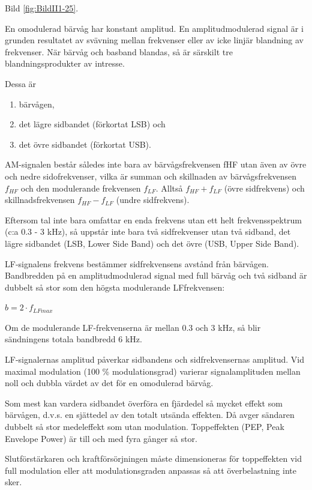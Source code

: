Bild \ref{fig:BildII1-25}.

En omodulerad bärvåg har konstant amplitud. En amplitudmodulerad signal är i
grunden resultatet av svävning mellan frekvenser eller av icke linjär blandning
av frekvenser. När  bärvåg och basband blandas, så är särskilt tre
blandningsprodukter av intresse.

Dessa är

\begin{enumerate}[label=-,noitemsep]
\item bärvågen,
\item det lägre sidbandet (förkortat LSB) och
\item det övre sidbandet (förkortat USB).
\end{enumerate}

AM-signalen består således inte bara av bärvågsfrekvensen fHF utan även av övre
och nedre sidofrekvenser, vilka är summan och skillnaden av bärvågsfrekvensen
\(f_{HF}\) och den modulerande frekvensen \(f_{LF}\). Alltså \(f_{HF} + f_{LF}\)
(övre sidfrekvens) och skillnadsfrekvensen \(f_{HF} - f_{LF}\) (undre
sidfrekvens).

Eftersom tal inte bara omfattar en enda frekvens utan ett helt frekvensspektrum
(c:a 0.3 - 3 kHz), så uppstår inte bara två sidfrekvenser utan två sidband, det
lägre sidbandet (LSB, Lower Side Band) och det övre (USB, Upper Side Band).

LF-signalens frekvens bestämmer sidfrekvensens avstånd från bärvågen.
Bandbredden på en amplitudmodulerad signal med full bärvåg och två sidband är
dubbelt så stor som den högsta modulerande LFfrekvensen:

\(b= 2 \cdot f_{LFmax}\)

Om de modulerande LF-frekvenserna är mellan 0.3 och 3 kHz, så blir sändningens
totala bandbredd 6 kHz.

LF-signalernas amplitud påverkar sidbandens och sidfrekvensernas amplitud. Vid
maximal modulation (100 \% modulationsgrad) varierar signalamplituden mellan
noll och dubbla värdet av det för en omodulerad bärvåg.

Som mest kan vardera sidbandet överföra en fjärdedel så mycket effekt som
bärvågen, d.v.s. en sjättedel av den totalt utsända effekten. Då avger sändaren
dubbelt så stor medeleffekt som utan modulation. Toppeffekten (PEP,
Peak Envelope Power) är till och med fyra gånger så stor.

Slutförstärkaren och kraftförsörjningen måste dimensioneras för toppeffekten vid
full modulation eller att modulationsgraden anpassas så att överbelastning inte
sker.

